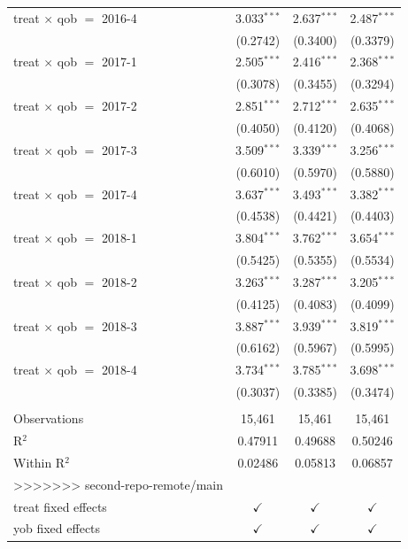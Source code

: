 \begin{table}[htbp]
\begin{tabular}{lccc}
      treat $\times$ qob $=$ 2016-4  & 3.033$^{***}$ & 2.637$^{***}$  & 2.487$^{***}$\\   
                                     & (0.2742)      & (0.3400)       & (0.3379)\\   
      treat $\times$ qob $=$ 2017-1  & 2.505$^{***}$ & 2.416$^{***}$  & 2.368$^{***}$\\   
                                     & (0.3078)      & (0.3455)       & (0.3294)\\   
      treat $\times$ qob $=$ 2017-2  & 2.851$^{***}$ & 2.712$^{***}$  & 2.635$^{***}$\\   
                                     & (0.4050)      & (0.4120)       & (0.4068)\\   
      treat $\times$ qob $=$ 2017-3  & 3.509$^{***}$ & 3.339$^{***}$  & 3.256$^{***}$\\   
                                     & (0.6010)      & (0.5970)       & (0.5880)\\   
      treat $\times$ qob $=$ 2017-4  & 3.637$^{***}$ & 3.493$^{***}$  & 3.382$^{***}$\\   
                                     & (0.4538)      & (0.4421)       & (0.4403)\\   
      treat $\times$ qob $=$ 2018-1  & 3.804$^{***}$ & 3.762$^{***}$  & 3.654$^{***}$\\   
                                     & (0.5425)      & (0.5355)       & (0.5534)\\   
      treat $\times$ qob $=$ 2018-2  & 3.263$^{***}$ & 3.287$^{***}$  & 3.205$^{***}$\\   
                                     & (0.4125)      & (0.4083)       & (0.4099)\\   
      treat $\times$ qob $=$ 2018-3  & 3.887$^{***}$ & 3.939$^{***}$  & 3.819$^{***}$\\   
                                     & (0.6162)      & (0.5967)       & (0.5995)\\   
      treat $\times$ qob $=$ 2018-4  & 3.734$^{***}$ & 3.785$^{***}$  & 3.698$^{***}$\\   
                                     & (0.3037)      & (0.3385)       & (0.3474)\\   
       \\
      Observations                   & 15,461        & 15,461         & 15,461\\  
      R$^2$                          & 0.47911       & 0.49688        & 0.50246\\  
      Within R$^2$                   & 0.02486       & 0.05813        & 0.06857\\  
>>>>>>> second-repo-remote/main
       \\
      treat fixed effects            & $\checkmark$  & $\checkmark$   & $\checkmark$\\   
      yob fixed effects              & $\checkmark$  & $\checkmark$   & $\checkmark$\\   
      \bottomrule
   \end{tabular}
\end{table}


